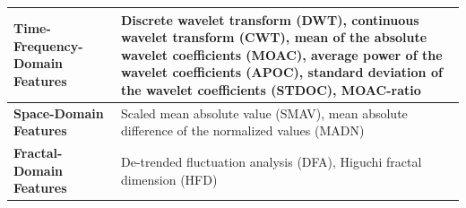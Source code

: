 \documentclass[sensors,review,accept,moreauthors,pdftex]{Definitions/mdpi}
\begin{document}
\begin{table}[H]
\begin{tabular}{m{105pt}m{320pt}}
		
		\textbf{Time-Frequency-Domain Features}& Discrete wavelet transform (DWT), continuous wavelet transform (CWT), mean of the absolute wavelet coefficients (MOAC), average power of the wavelet coefficients (APOC), standard deviation of the wavelet coefficients (STDOC), MOAC-ratio \\
		\midrule
		\vspace{\fill}\textbf{Space-Domain Features}& Scaled mean absolute value (SMAV), mean absolute difference of the normalized values (MADN)\\
		\midrule
		\textbf{Fractal-Domain Features}&
		De-trended fluctuation analysis (DFA), Higuchi fractal dimension (HFD)\\
		\bottomrule
		
	\end{tabular}
	
\end{table}
\unskip
\end{document}

